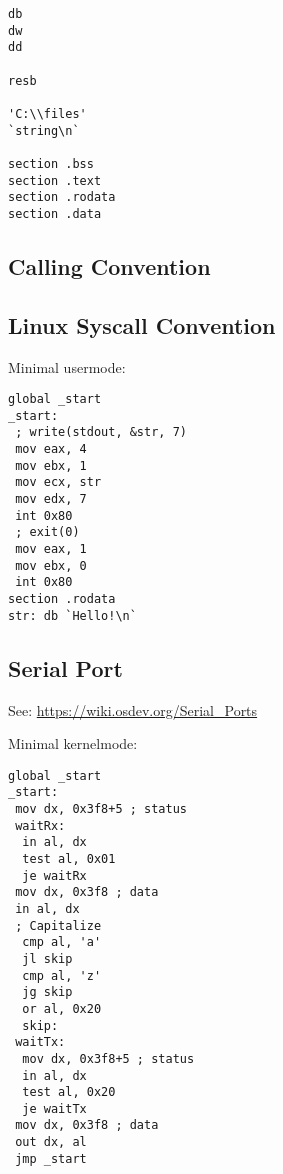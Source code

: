 \documentclass[8pt]{article}
\begin{document}
\begin{multicols}{5}
\begin{lstlisting}
db
dw
dd

resb

'C:\\files'
`string\n`

section .bss
section .text
section .rodata
section .data
\end{lstlisting}

\subsection*{Calling Convention}

\subsection*{Linux Syscall Convention}


Minimal usermode:

\begin{lstlisting}
global _start
_start:
 ; write(stdout, &str, 7)
 mov eax, 4
 mov ebx, 1
 mov ecx, str
 mov edx, 7
 int 0x80
 ; exit(0)
 mov eax, 1
 mov ebx, 0
 int 0x80
section .rodata
str: db `Hello!\n`
\end{lstlisting}

\subsection*{Serial Port}

See: \url{https://wiki.osdev.org/Serial_Ports}

Minimal kernelmode:

\begin{lstlisting}
global _start
_start:
 mov dx, 0x3f8+5 ; status
 waitRx:
  in al, dx
  test al, 0x01
  je waitRx
 mov dx, 0x3f8 ; data
 in al, dx
 ; Capitalize
  cmp al, 'a'
  jl skip
  cmp al, 'z'
  jg skip
  or al, 0x20
  skip:
 waitTx:
  mov dx, 0x3f8+5 ; status
  in al, dx
  test al, 0x20
  je waitTx
 mov dx, 0x3f8 ; data
 out dx, al
 jmp _start
\end{lstlisting}

\end{multicols}
\end{document}
